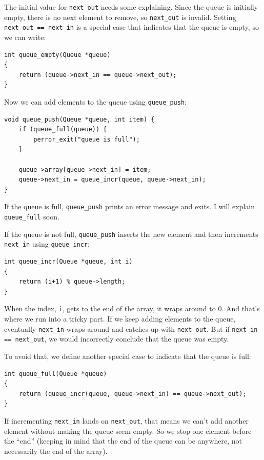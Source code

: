\documentclass[12pt]{book}
\begin{document}
{The initial value for \verb"next_out" needs some explaining.
Since the queue is initially empty, there is no next element to
remove, so \verb"next_out" is invalid.  Setting
\verb"next_out == next_in" is a special case that indicates
that the queue is empty, so we can write:

\begin{verbatim}
int queue_empty(Queue *queue)
{
    return (queue->next_in == queue->next_out);
}
\end{verbatim}

Now we can add elements to the queue using \verb"queue_push":

\begin{verbatim}
void queue_push(Queue *queue, int item) {
    if (queue_full(queue)) {
        perror_exit("queue is full");
    }
  
    queue->array[queue->next_in] = item;
    queue->next_in = queue_incr(queue, queue->next_in);
}
\end{verbatim}

If the queue is full, \verb"queue_push" prints an error message
and exits.  I will explain \verb"queue_full" soon.

If the queue is not full, \verb"queue_push" inserts the new
element and then increments \verb"next_in" using \verb"queue_incr":

\begin{verbatim}
int queue_incr(Queue *queue, int i)
{
    return (i+1) % queue->length;
}
\end{verbatim}

When the index, {\tt i}, gets to the end of the array, it wraps around
to 0.  And that's where we run into a tricky part.  If we keep adding
elements to the queue, eventually \verb"next_in" wraps around and catches
up with \verb"next_out".  But if \verb"next_in == next_out", we would
incorrectly conclude that the queue was empty.

To avoid that, we define another special case to indicate that the
queue is full:

\begin{verbatim}
int queue_full(Queue *queue)
{
    return (queue_incr(queue, queue->next_in) == queue->next_out);
}
\end{verbatim}

If incrementing \verb"next_in" lands on \verb"next_out", that means
we can't add another element without making the queue seem empty.  So
we stop one element before the ``end'' (keeping in mind that the end of
the queue can be anywhere, not necessarily the end of the array).

}
\end{document}
